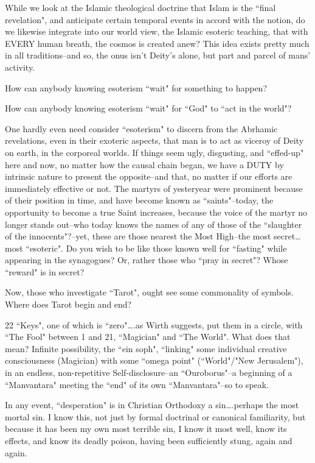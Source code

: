 \begin{footnotesize}
\begin{sffamily}
While we look at the Islamic theological doctrine that Islam is the ``final revelation", and anticipate certain temporal events in accord with the notion, do we likewise integrate into our world view, the Islamic esoteric teaching, that with EVERY human breath, the cosmos is created anew? This idea exists pretty much in all traditions–and so, the onus isn't Deity's alone, but part and parcel of mans' activity. 

How can anybody knowing esoterism ``wait" for something to happen?

How can anybody knowing esoterism ``wait" for ``God" to ``act in the world"?

One hardly even need consider ``esoterism" to discern from the Abrhamic revelations, even in their exoteric aspects, that man is to act as viceroy of Deity on earth, in the corporeal worlds. If things seem ugly, disgusting, and ``effed-up" here and now, no matter how the causal chain began, we have a DUTY by intrinsic nature to present the opposite–and that, no matter if our efforts are immediately effective or not. The martyrs of yesteryear were prominent because of their position in time, and have become known as ``saints"–today, the opportunity to become a true Saint increases, because the voice of the martyr no longer stands out–who today knows the names of any of those of the ``slaughter of the innocents"?–yet, these are those nearest the Most High–the most secret…most ``esoteric". Do you wish to be like those known well for ``fasting" while appearing in the synagogues? Or, rather those who ``pray in secret"? Whose ``reward" is in secret?

Now, those who investigate ``Tarot", ought see some commonality of symbols. Where does Tarot begin and end?

22 ``Keys", one of which is ``zero"….as Wirth suggests, put them in a circle, with ``The Fool" between 1 and 21, ``Magician" and ``The World". What does that mean? Infinite possibility, the ``ein soph", ``linking" some individual creative consciousness (Magician) with some ``omega point" (``World"/"New Jerusalem"), in an endless, non-repetitive Self-disclosure–an ``Ouroborus"–a beginning of a ``Manvantara" meeting the ``end" of its own ``Manvantara"–so to speak. 

In any event, ``desperation" is in Christian Orthodoxy a sin….perhaps the most mortal sin. I know this, not just by formal doctrinal or canonical familiarity, but because it has been my own most terrible sin, I know it most well, know its effects, and know its deadly poison, having been sufficiently stung, again and again. 


\end{sffamily}
\end{footnotesize}
